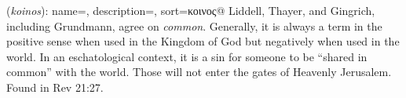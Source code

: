 \item[Common,]

(\textit{koinos}):
{
    name=,
    description={},
    sort=κοινος@
}
Liddell, Thayer, and Gingrich, including Grundmann, agree on \emph{common}. Generally, it is always a term in the positive sense when used in the Kingdom of God but negatively when used in the world. In an eschatological context, it is a sin for someone to be ``shared in common'' with the world. Those will not enter the gates of Heavenly Jerusalem.
Found in Rev 21:27.
